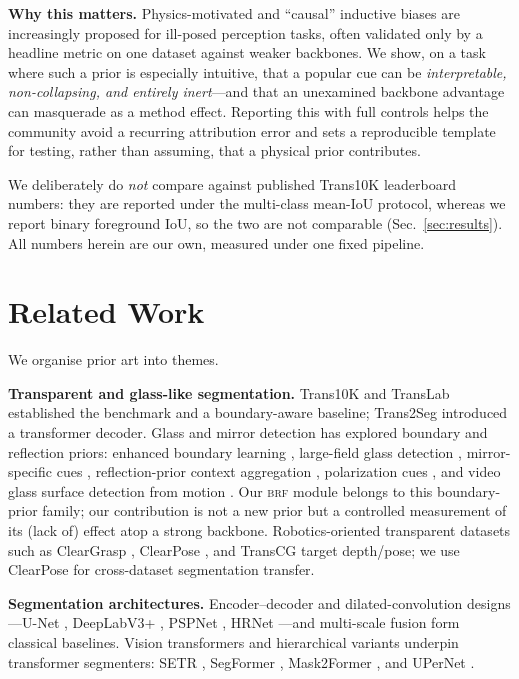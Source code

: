 \documentclass[conference]{IEEEtran}
\newcommand{\brf}{\textsc{brf}}
\newcommand{\iou}{IoU}
\begin{document}
\textbf{Why this matters.} Physics-motivated and ``causal'' inductive biases are
increasingly proposed for ill-posed perception tasks, often validated only by a
headline metric on one dataset against weaker backbones. We show, on a task
where such a prior is especially intuitive, that a popular cue can be
\emph{interpretable, non-collapsing, and entirely inert}---and that an
unexamined backbone advantage can masquerade as a method effect. Reporting this
with full controls helps the community avoid a recurring attribution error and
sets a reproducible template for testing, rather than assuming, that a physical
prior contributes.

We deliberately do \emph{not} compare against published Trans10K leaderboard
numbers: they are reported under the multi-class mean-\iou{} protocol, whereas we
report binary foreground \iou, so the two are not comparable
(Sec.~\ref{sec:results}). All numbers herein are our own, measured under one
fixed pipeline.

\section{Related Work}
We organise prior art into themes.

\textbf{Transparent and glass-like segmentation.} Trans10K and TransLab
\cite{xie2020translab} established the benchmark and a boundary-aware baseline;
Trans2Seg \cite{xie2021trans2seg} introduced a transformer decoder. Glass and
mirror detection has explored boundary and reflection priors: enhanced boundary
learning \cite{he2021eblnet}, large-field glass detection \cite{mei2020gdnet},
mirror-specific cues \cite{yang2019mirrornet}, reflection-prior context
aggregation \cite{lin2021gsd}, polarization cues
\cite{mei2022polarization}, and video glass surface detection from motion
\cite{liu2024vgsd}. Our \brf{} module belongs to this boundary-prior
family; our contribution is not a new prior but a controlled measurement of its
(lack of) effect atop a strong backbone. Robotics-oriented transparent datasets
such as ClearGrasp \cite{sajjan2020cleargrasp}, ClearPose
\cite{chen2022clearpose}, and TransCG \cite{fang2022transcg} target depth/pose;
we use ClearPose for cross-dataset segmentation transfer.

\textbf{Segmentation architectures.} Encoder--decoder and dilated-convolution
designs---U-Net \cite{ronneberger2015unet}, DeepLabV3+
\cite{chen2018deeplabv3plus}, PSPNet \cite{zhao2017pspnet}, HRNet
\cite{wang2020hrnet}---and multi-scale fusion \cite{lin2017fpn} form classical
baselines. Vision transformers \cite{dosovitskiy2021vit} and hierarchical
variants \cite{liu2021swin} underpin transformer segmenters: SETR
\cite{zheng2021setr}, SegFormer \cite{xie2021segformer}, Mask2Former
\cite{cheng2022mask2former}, and UPerNet \cite{xiao2018upernet}.
\end{document}
